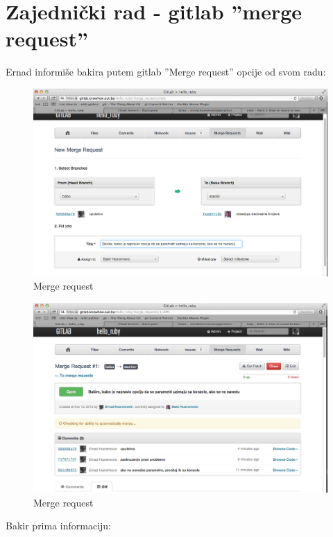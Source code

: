 \documentclass[times, utf8, seminar]{fit}
\begin{document}
\section{Zajednički rad - gitlab ''merge request''}

Ernad informiše bakira putem gitlab ''Merge request'' opcije od svom radu:

\begin{figure}[H]
\centering
\includegraphics[width=15cm]{img/gitlab_merge_request.png}
\caption{Merge request}
\end{figure}

\begin{figure}[H]
\centering
\includegraphics[width=15cm]{img/gitlab_merge_request_2.png}
\caption{Merge request}
\end{figure}

Bakir prima informaciju:
\end{document}

